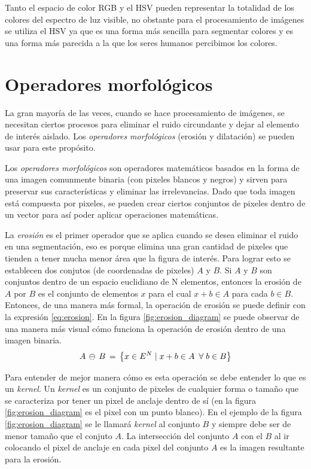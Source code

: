 \documentclass{book}
\begin{document}
Tanto el espacio de color RGB y el HSV pueden representar la totalidad de los colores del espectro de luz visible, no obstante para el procesamiento de imágenes se utiliza el HSV ya que es una forma más sencilla para segmentar colores y es una forma más parecida a la que los seres humanos percibimos los colores.

\section{Operadores morfológicos}	
La gran mayoría de las veces, cuando se hace procesamiento de imágenes, se necesitan ciertos procesos para eliminar el ruido circundante y dejar al elemento de interés aislado. Los \textit{operadores morfológicos} (erosión y dilatación) se pueden usar para este propósito.

Los \textit{operadores morfológicos} son operadores matemáticos basados en la forma de una imagen comunmente binaria (con pixeles blancos y negros) y sirven para preservar sus características y eliminar las irrelevancias. Dado que toda imagen está compuesta por pixeles, se pueden crear ciertos conjuntos de pixeles dentro de un vector para así poder aplicar operaciones matemáticas. 

La \textit{erosión} es el primer operador que se aplica cuando se desea eliminar el ruido en una segmentación, eso es porque elimina una gran cantidad de pixeles que tienden a tener mucha menor área que la figura de interés. Para lograr esto se establecen dos conjutos (de coordenadas de pixeles) $A$ y $B$. Si $A$ y $B$ son conjuntos dentro de un espacio euclidiano de N elementos, entonces la erosión de $A$ por $B$ es el conjunto de elementos $x$ para el cual $x + b \in  A$ para cada $b \in B$. Entonces, de una manera más formal, la operación de erosión se puede definir con la expresión \ref{eq:erosion}.
En la figura \ref{fig:erosion_diagram} se puede observar de una manera más visual cómo funciona la operación de erosión dentro de una imagen binaria.
\begin{equation}
A\thinspace\ominus\thinspace B\thinspace=\thinspace \left \{ x \in E^N  \mid x+b \in A \enspace \forall \; b \in B\right \}
\label{eq:erosion}
\end{equation}

 Para entender de mejor manera cómo es esta operación se debe entender lo que es un \textit{kernel}. Un \textit{kernel} es un conjunto de pixeles de cualquier forma o tamaño que se caracteriza por tener un pixel de anclaje dentro de sí (en la figura \ref{fig:erosion_diagram} es el pixel con un punto blanco). En el ejemplo de la figura \ref{fig:erosion_diagram} se le llamará \textit{kernel} al conjunto $B$ y siempre debe ser de menor tamaño que el conjuto $A$. La intersección del conjunto $A$ con el $B$ al ir colocando el pixel de anclaje en cada pixel del conjunto $A$ es la imagen resultante para la erosión.
 
\end{document}
